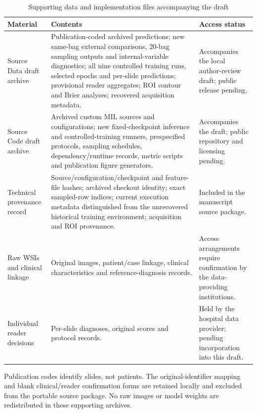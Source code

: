 \begin{table}[H]\centering
\caption{Supporting data and implementation files accompanying the draft}\label{tab:S8}
\small
\begin{tabularx}{\textwidth}{@{}>{\raggedright\arraybackslash}p{}>{\raggedright\arraybackslash}X>{\raggedright\arraybackslash}p{}@{}}
\toprule
Material & Contents & Access status \\
\midrule
Source Data draft archive & Publication-coded archived predictions; new same-bag external comparisons, 20-bag sampling outputs and internal-variable diagnostics; all nine controlled training runs, selected epochs and per-slide predictions; provisional reader aggregates; ROI contour and Brier analyses; recovered acquisition metadata. & Accompanies the local author-review draft; public release pending. \\
\addlinespace
Source Code draft archive & Archived custom MIL sources and configurations; new fixed-checkpoint inference and controlled-training runners, prespecified protocols, sampling schedules, dependency/runtime records, metric scripts and publication figure generators. & Accompanies the draft; public repository and licensing pending. \\
\addlinespace
Technical provenance record & Source/configuration/checkpoint and feature-file hashes; archived checkout identity; exact sampled-row indices; current execution metadata distinguished from the unrecovered historical training environment; acquisition and ROI provenance. & Included in the manuscript source package. \\
\addlinespace
Raw WSIs and clinical linkage & Original images, patient/case linkage, clinical characteristics and reference-diagnosis records. & Access arrangements require confirmation by the data-providing institutions. \\
\addlinespace
Individual reader decisions & Per-slide diagnoses, original scores and protocol records. & Held by the hospital data provider; pending incorporation into this draft. \\
\bottomrule
\end{tabularx}
\par\medskip\footnotesize Publication codes identify slides, not patients. The original-identifier mapping and blank clinical/reader confirmation forms are retained locally and excluded from the portable source package. No raw images or model weights are redistributed in these supporting archives.
\end{table}

